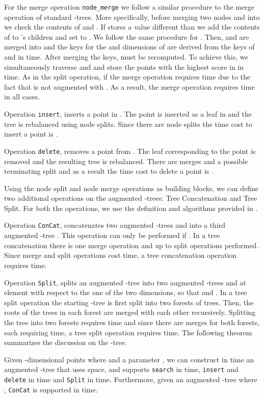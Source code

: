 \documentclass{llncs}
\begin{document}
For the merge operation \texttt{node\_merge} we follow a similar procedure to the merge operation of standard -trees. More specifically, before merging two nodes  and  into  we check the contents of  and . If  stores a value different than  we add the contents of  to 's children and set  to . We follow the same procedure for . Then,  and  are merged into  and the keys for the  and  dimensions of  are derived from the keys of  and  in  time. After merging the keys,  must be recomputed. To achieve this, we simultaneously traverse  and  and store the  points with the highest score in  in  time.
As in the split operation, if  the merge operation requires  time due to the fact that  is not augmented with . As a result, the merge operation requires  time in all cases.

Operation \texttt{insert}, inserts a point  in . The point is inserted as a leaf in  and the tree is rebalanced using node splits. Since there are  node splits the time cost to insert a point is .

Operation \texttt{delete}, removes a point  from . The leaf corresponding to the point is removed and the resulting tree is rebalanced. There are  merges and a possible terminating split and as a result the time cost to delete a point is .

Using the node split and node merge operations as building blocks, we can define two additional operations on the augmented -trees: Tree Concatenation and Tree Split. For both the operations, we use the definition and algorithms provided in \cite{Mehlhorn84}.

Operation \texttt{ConCat}, concatenates two augmented -trees  and  into a third augmented -tree . This operation can only be performed if . In a tree concatenation there is one merge operation and up to  split operations performed. Since merge and split operations cost  time, a tree concatenation operation requires  time.

Operation \texttt{Split}, splits an augmented -tree  into two augmented -trees  and  at element  with respect to the one of the two dimensions, so that  and . In a tree split operation the starting -tree is first split into two forests of trees. Then, the roots of the trees in each forest are merged with each other recursively. Splitting the tree into two forests requires  time and since there are  merges for both forests, each requiring  time, a tree split operation requires  time. The following theorem summarizes the discussion on the -tree.

\begin{theorem} \label{theorem:AugABTreeCombined}
Given  -dimensional points  where  and a parameter , we can construct in  time an augmented -tree  that uses  space, and supports \texttt{search} in  time, \texttt{insert} and \texttt{delete} in  time and \texttt{Split} in  time. Furthermore, given an augmented -tree  where , \texttt{ConCat} is supported in  time.
\end{theorem}
\end{document}
